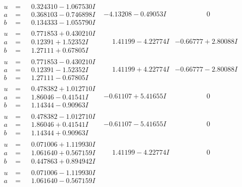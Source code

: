 \documentclass[1p]{elsarticle_modified}
\theoremstyle{definition}
\begin{document}
$$\begin{array}{c|c|c}
\begin{aligned}
u &= \phantom{-}0.324310 - 1.067530 I \\
a &= \phantom{-}0.368103 - 0.746898 I \\
b &= \phantom{-}0.134333 - 1.055790 I\end{aligned}
 & -4.13208 - 0.49053 I & \phantom{-0.000000 } 0 \\ \hline\begin{aligned}
u &= \phantom{-}0.771853 + 0.430210 I \\
a &= \phantom{-}0.12391 + 1.52352 I \\
b &= \phantom{-}1.27111 + 0.67805 I\end{aligned}
 & \phantom{-}1.41199 - 4.22774 I & -0.66777 + 2.80088 I \\ \hline\begin{aligned}
u &= \phantom{-}0.771853 - 0.430210 I \\
a &= \phantom{-}0.12391 - 1.52352 I \\
b &= \phantom{-}1.27111 - 0.67805 I\end{aligned}
 & \phantom{-}1.41199 + 4.22774 I & -0.66777 - 2.80088 I \\ \hline\begin{aligned}
u &= \phantom{-}0.478382 + 1.012710 I \\
a &= \phantom{-}1.86046 - 0.41541 I \\
b &= \phantom{-}1.14344 - 0.90963 I\end{aligned}
 & -0.61107 + 5.41655 I & \phantom{-0.000000 } 0 \\ \hline\begin{aligned}
u &= \phantom{-}0.478382 - 1.012710 I \\
a &= \phantom{-}1.86046 + 0.41541 I \\
b &= \phantom{-}1.14344 + 0.90963 I\end{aligned}
 & -0.61107 - 5.41655 I & \phantom{-0.000000 } 0 \\ \hline\begin{aligned}
u &= \phantom{-}0.071006 + 1.119930 I \\
a &= \phantom{-}1.061640 + 0.567159 I \\
b &= \phantom{-}0.447863 + 0.894942 I\end{aligned}
 & \phantom{-}1.41199 - 4.22774 I & \phantom{-0.000000 } 0 \\ \hline\begin{aligned}
u &= \phantom{-}0.071006 - 1.119930 I \\
a &= \phantom{-}1.061640 - 0.567159 I \\

\end{aligned}
\end{array}$$
\end{document}
